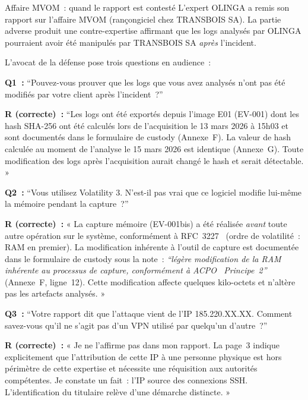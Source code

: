 \begin{boxscenario}{Affaire MVOM~: quand le rapport est contesté}
L'expert OLINGA a remis son rapport sur l'affaire MVOM (rançongiciel
chez TRANSBOIS SA). La partie adverse produit une contre-expertise
affirmant que les logs analysés par OLINGA pourraient avoir été
manipulés par TRANSBOIS SA \emph{après} l'incident.

L'avocat de la défense pose trois questions en audience~:

\textbf{Q1~:} ``Pouvez-vous prouver que les logs que vous avez
analysés n'ont pas été modifiés par votre client après l'incident~?''

\textbf{R (correcte)~:} ``Les logs ont été exportés depuis l'image
E01 (EV-001) dont les hash SHA-256 ont été calculés lors de
l'acquisition le 13 mars 2026 à 15h03 et sont documentés dans
le formulaire de custody (Annexe~F). La valeur de hash calculée
au moment de l'analyse le 15 mars 2026 est identique (Annexe~G).
Toute modification des logs après l'acquisition aurait changé
le hash et serait détectable. »

\textbf{Q2~:} ``Vous utilisez Volatility 3. N'est-il pas vrai que
ce logiciel modifie lui-même la mémoire pendant la capture~?''

\textbf{R (correcte)~:} « La capture mémoire (EV-001bis) a été
réalisée \emph{avant} toute autre opération sur le système, conformément
à RFC~3227~\cite{rfc3227} (ordre de volatilité~: RAM en premier). La modification
inhérente à l'outil de capture est documentée dans le formulaire
de custody sous la note~: \textit{``légère modification de la RAM
inhérente au processus de capture, conformément à ACPO~\cite{acpo2012} Principe~2''}
(Annexe~F, ligne~12). Cette modification affecte quelques kilo-octets
et n'altère pas les artefacts analysés. »

\textbf{Q3~:} ``Votre rapport dit que l'attaque vient de l'IP
185.220.XX.XX. Comment savez-vous qu'il ne s'agit pas d'un VPN
utilisé par quelqu'un d'autre~?''

\textbf{R (correcte)~:} « Je ne l'affirme pas dans mon rapport.
La page~3 indique explicitement que l'attribution de cette IP à une
personne physique est hors périmètre de cette expertise et nécessite
une réquisition aux autorités compétentes. Je constate un fait~:
l'IP source des connexions SSH. L'identification du titulaire relève
d'une démarche distincte. »
\end{boxscenario}

\separateur


